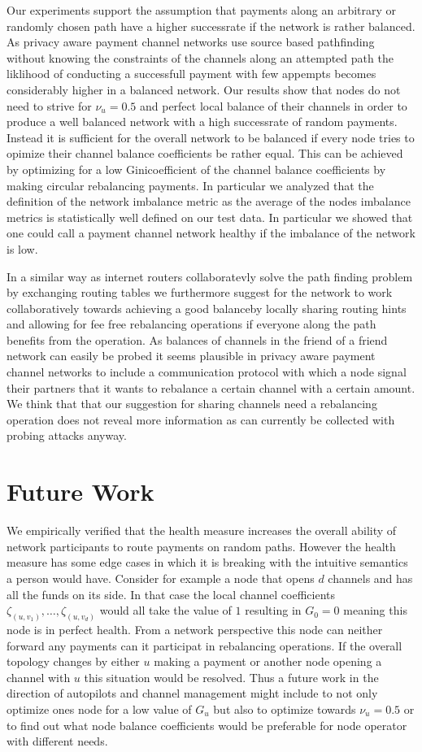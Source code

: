 \documentclass[a4paper]{paper}
\begin{document}
Our experiments support the assumption that payments along an arbitrary or randomly chosen path have a higher successrate if the network is rather balanced.
As privacy aware payment channel networks use source based pathfinding without knowing the constraints of the channels along an attempted path the liklihood of conducting a successfull payment with few appempts becomes considerably higher in a balanced network.
Our results show that nodes do not need to strive for $\nu_u = 0.5$ and perfect local balance of their channels in order to produce a well balanced network with a high successrate of random payments.
Instead it is sufficient for the overall network to be balanced if every node tries to opimize their channel balance coefficients be rather equal. 
This can be achieved by optimizing for a low Ginicoefficient of the channel balance coefficients by making circular rebalancing payments.
In particular we analyzed that the definition of the network imbalance metric as the average of the nodes imbalance metrics is statistically well defined on our test data.
In particular we showed that one could call a payment channel network healthy if the imbalance of the network is low.

In a similar way as internet routers collaboratevly solve the path finding problem by exchanging routing tables we furthermore suggest for the network to work collaboratively towards achieving a good balanceby locally sharing routing hints and allowing for fee free rebalancing operations if everyone along the path benefits from the operation. 
As balances of channels in the friend of a friend network can easily be probed it seems plausible in privacy aware payment channel networks to include a communication protocol with which a node signal their partners that it wants to rebalance a certain channel with a certain amount.
We think that that our suggestion for sharing channels need a rebalancing operation does not reveal more information as can currently be collected with probing attacks anyway.

\section{Future Work}\label{sec:future}
We empirically verified that the health measure increases the overall ability of network participants to route payments on random paths.
However the health measure has some edge cases in which it is breaking with the intuitive semantics a person would have.
Consider for example a node that opens $d$ channels and has all the funds on its side.
In that case the local channel coefficients $\zeta_{(u,v_1)},\dots,\zeta_{(u,v_d)}$ would all take the value of $1$ resulting in $G_0 = 0$ meaning this node is in perfect health.
From a network perspective this node can neither forward any payments can it participat in rebalancing operations.
If the overall topology changes by either $u$ making a payment or another node opening a channel with $u$ this situation would be resolved.
Thus a future work in the direction of autopilots and channel management might include to not only optimize ones node for a low value of $G_u$ but also to optimize towards $\nu_u = 0.5$ or to find out what node balance coefficients would be preferable for node operator with different needs.
\end{document}
